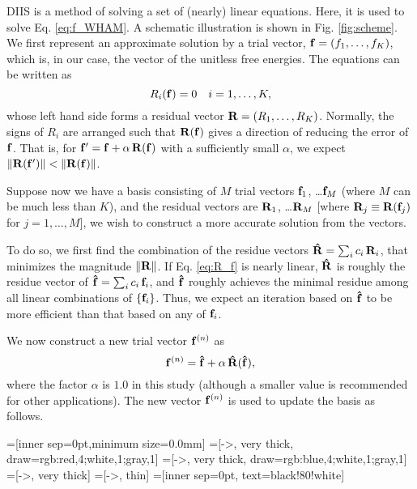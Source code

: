 \documentclass[aip,jcp,preprint,superscriptaddress]{revtex4-1}
\begin{document}
DIIS is a method of solving a set of
(nearly) linear equations\cite{
pulay1980, *pulay1982, *hamilton1986,
kovalenko1999, howard2011}.
%
Here, it is used
to solve Eq. \eqref{eq:f_WHAM}.
%
A schematic illustration
is shown in Fig. \ref{fig:scheme}.
%
We first represent an approximate solution
by a trial vector,
$\mathbf{f} = (f_1, \dots, f_K)$,
which is, in our case, the vector of
the unitless free energies.
%
The equations can be written as
%
\begin{equation}
  R_i(\mathbf{f}) = 0  \quad i = 1, \ldots, K,
  \label{eq:R_f}
\end{equation}
%
whose left hand side forms a residual vector
$\mathbf{R} = (R_1, \dots, R_K)$.
%
Normally, the signs of $R_i$ are arranged such that
$\mathbf{R}(\mathbf{f})$
gives a direction of reducing the error of $\mathbf{f}$.
%
That is,
for $\mathbf{f}' = \mathbf{f} + \alpha \, \mathbf{R}(\mathbf{f})$
with a sufficiently small $\alpha$,
we expect
%
$\| \mathbf{R}(\mathbf{f}') \| < \| \mathbf{R}(\mathbf{f}) \|$.



Suppose now we have a basis consisting of $M$ trial vectors
$\mathbf{f}_1$, \dots $\mathbf{f}_M$
(where $M$ can be much less than $K$),
%
and the residual vectors are
$\mathbf{R}_1$, \dots $\mathbf{R}_M$
[where $\mathbf{R}_j \equiv \mathbf{R}(\mathbf{f}_j)$
for $j = 1, \dots, M$],
%
we wish to construct a more accurate solution
from the vectors.



To do so, we first find the combination of the residue vectors
$\mathbf{\hat R} = \sum_i c_i \, \mathbf{R}_i$,
that minimizes the magnitude
$\| \mathbf{R} \|$.
%
If Eq. \eqref{eq:R_f} is nearly linear,
%
$\mathbf{\hat R}$
is roughly the residue vector of
$\mathbf{\hat f} = \sum_i c_i \, \mathbf{f}_i$,
and
$\mathbf{\hat f}$
roughly achieves the minimal residue
among all linear combinations of
$\{ \mathbf{f}_i \}$.
%
Thus,
we expect an iteration based on
$\mathbf{\hat f}$
to be more efficient than that
based on any of
$\mathbf{f}_i$.


We now construct a new trial vector $\mathbf{f}^{(n)}$ as
%
\begin{equation}
\mathbf{f}^{(n)}
=
\mathbf{\hat f}
+
\alpha \, \mathbf{\hat R}( \mathbf{\hat f} ),
\end{equation}
%
where the factor $\alpha$ is $1.0$ in this study
(although a smaller value is recommended
for other applications\cite{kovalenko1999, howard2011}).
%
The new vector $\mathbf{f}^{(n)}$
is used to update the basis as follows.





=[inner sep=0pt,minimum size=0.0mm]
=[->, very thick, draw={rgb:red,4;white,1;gray,1}]
=[->, very thick, draw={rgb:blue,4;white,1;gray,1}]
=[->, very thick]
=[->, thin]
=[inner sep=0pt, text=black!80!white]
\end{document}
